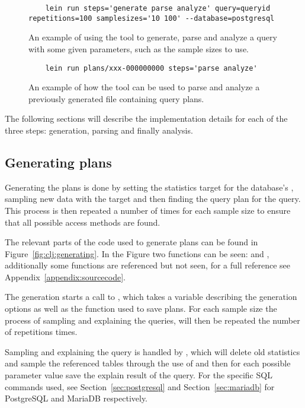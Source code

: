 \begin{figure}[ht]
  \begin{verbatim}
    lein run steps='generate parse analyze' query=queryid repetitions=100 samplesizes='10 100' --database=postgresql
  \end{verbatim}
  \caption[Using the tool to generate, parse and analyze a query]{An example of
    using the tool to generate, parse and analyze a query with some given
    parameters, such as the sample sizes to use.}\label{fig:cmd:runtool1}
\end{figure}

\begin{figure}[ht]
  \begin{verbatim}
    lein run plans/xxx-000000000 steps='parse analyze'
  \end{verbatim}
  \caption[Using the tool to parse and analyze a previously generated plan]{An
    example of how the tool can be used to parse and analyze a previously
    generated file containing query plans.}\label{fig:cmd:runtool2}
\end{figure}

The following sections will describe the implementation details for each of the
three steps: generation, parsing and finally analysis.

\subsection{Generating plans}\label{sec:generatingplans}
Generating the plans is done by setting the statistics target for the database's
, sampling new data with the target and then finding the query plan for
the query. This process is then repeated a number of times for each sample size
to ensure that all possible access methods are found.

The relevant parts of the code used to generate plans can be found in
Figure~\ref{fig:clj:generating}. In the Figure two functions can be seen:
 and , additionally some functions are
referenced but not seen, for a full reference see Appendix~\ref{appendix:sourcecode}.

The generation starts a call to , which takes a variable
describing the generation options as well as the function used to save plans.
For each sample size the process of sampling and explaining the queries, will
then be repeated the number of repetitions times.

Sampling and explaining the query is handled by , which
will delete old statistics and sample the referenced tables through the use of
 and then for each possible parameter value save the explain
result of the query. For the specific SQL commands used, see
Section~\ref{sec:postgresql} and Section~\ref{sec:mariadb} for PostgreSQL and MariaDB respectively.

